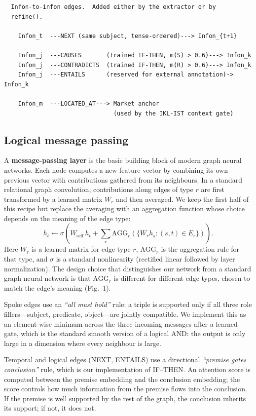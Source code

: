 \documentclass[11pt,a4paper]{article}
\begin{document}
\begin{verbatim}
  Infon-to-infon edges.  Added either by the extractor or by
  refine().

    Infon_t  ---NEXT (same subject, tense-ordered)---> Infon_{t+1}

    Infon_j  ---CAUSES       (trained IF-THEN, m(S) > 0.6)---> Infon_k
    Infon_j  ---CONTRADICTS  (trained IF-THEN, m(R) > 0.6)---> Infon_k
    Infon_j  ---ENTAILS      (reserved for external annotation)-> Infon_k

    Infon_m  ---LOCATED_AT---> Market anchor
                               (used by the IKL-IST context gate)
\end{verbatim}

\subsection{Logical message passing}

A \textbf{message-passing layer} is the basic building block of
modern graph neural networks. Each node computes a new feature
vector by combining its own previous vector with contributions
gathered from its neighbours. In a standard relational graph
convolution, contributions along edges of type $r$ are first
transformed by a learned matrix $W_r$ and then averaged. We keep
the first half of this recipe but replace the averaging with an
aggregation function whose choice depends on the meaning of the
edge type:
\[
h_t \leftarrow \sigma\!\left(W_{\text{self}}\,h_t + \sum_r \mathrm{AGG}_r\!\left(\{W_r h_s : (s,t)\in E_r\}\right)\right).
\]
Here $W_r$ is a learned matrix for edge type $r$,
$\mathrm{AGG}_r$ is the aggregation rule for that type, and
$\sigma$ is a standard nonlinearity (rectified linear followed by
layer normalization). The design choice that distinguishes our
network from a standard graph neural network is that
$\mathrm{AGG}_r$ is different for different edge types, chosen to
match the edge's meaning (Fig.~1).

Spoke edges use an \textit{``all must hold''} rule: a triple is
supported only if all three role fillers---subject, predicate,
object---are jointly compatible. We implement this as an
element-wise minimum across the three incoming messages after a
learned gate, which is the standard smooth version of a logical
AND: the output is only large in a dimension where every
neighbour is large.

Temporal and logical edges (NEXT, ENTAILS) use a directional
\textit{``premise gates conclusion''} rule, which is our
implementation of IF--THEN. An attention score is computed
between the premise embedding and the conclusion embedding; the
score controls how much information from the premise flows into
the conclusion. If the premise is well supported by the rest of
the graph, the conclusion inherits its support; if not, it does
not.
\end{document}
